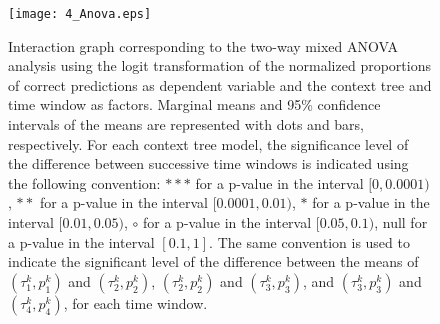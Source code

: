 \documentclass[fleqn,10pt]{wlscirep}
\begin{document}
\begin{figure}[h!]
	\centering
	\texttt{[image: 4\_Anova.eps]}%
	\caption{Interaction graph corresponding to the two-way mixed ANOVA analysis using the logit transformation of the normalized proportions of correct predictions as dependent variable and the context tree and time window as factors. Marginal means and 95\% confidence intervals of the means are represented with dots and bars, respectively. For each context tree model, the significance level of the difference between successive time windows is indicated using the following convention: $***$ for a p-value in the interval $[0,0.0001)$, $**$ for a p-value in the interval $[0.0001,0.01)$, $*$ for a p-value in the interval $[0.01,0.05)$, $\circ$ for a p-value in the interval $[0.05,0.1)$, null for a p-value in the interval $[0.1,1]$. The same convention is used to indicate the significant level of the difference between the means of $(\tau^k_1, p^k_1)$ and $(\tau^k_2, p^k_2)$, $(\tau^k_2, p^k_2)$ and $(\tau^k_3, p^k_3)$, and $(\tau^k_3, p^k_3)$ and $(\tau^k_4, p^k_4)$, for each time window. }    
	\label{fig:anova}%
\end{figure}
\FloatBarrier
 
\end{document}
